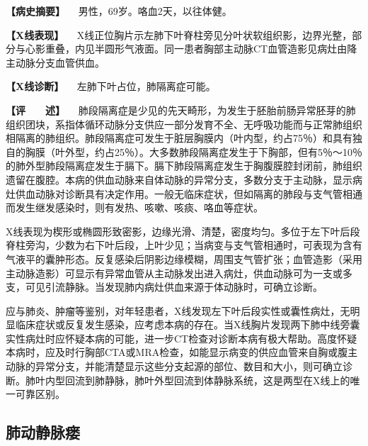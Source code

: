 \textbf{【病史摘要】} 　男性，69岁。咯血2天，以往体健。

\textbf{【X线表现】}
　X线正位胸片示左肺下叶脊柱旁见分叶状软组织影，边界光整，部分与心影重叠，内见半圆形气液面。同一患者胸部主动脉CT血管造影见病灶由降主动脉分支血管供血。

\textbf{【X线诊断】} 　左肺下叶占位，肺隔离症可能。

\textbf{【评　　述】}
　肺段隔离症是少见的先天畸形，为发生于胚胎前肠异常胚芽的肺组织团块，系指体循环动脉分支供应一部分发育不全、无呼吸功能而与正常肺组织相隔离的肺组织。肺段隔离症可发生于脏层胸膜内（叶内型，约占75％）和具有独自的胸膜（叶外型，约占25％）。大多数肺段隔离症发生于下胸部，但有5％～10％的肺外型肺段隔离症发生于膈下。膈下肺段隔离症发生于胸腹膜腔封闭前，肺组织遗留在腹腔。本病的供血动脉来自体动脉的异常分支，多数分支于主动脉，显示病灶供血动脉对诊断具有决定作用。一般无临床症状，但如隔离的肺段与支气管相通而发生继发感染时，则有发热、咳嗽、咳痰、咯血等症状。

X线表现为楔形或椭圆形致密影，边缘光滑、清楚，密度均匀。多位于左下叶后段脊柱旁沟，少数为右下叶后段，上叶少见；当病变与支气管相通时，可表现为含有气液平的囊肿形态。反复感染后阴影边缘模糊，周围支气管扩张；血管造影（采用主动脉造影）可显示有异常血管从主动脉发出进入病灶，供血动脉可为一支或多支，可见引流静脉。当发现肺内病灶供血来源于体动脉时，可确立诊断。

应与肺炎、肿瘤等鉴别，对年轻患者，X线发现左下叶后段实性或囊性病灶，无明显临床症状或反复发生感染，应考虑本病的存在。当X线胸片发现两下肺中线旁囊实性病灶时应怀疑本病的可能，进一步CT检查对诊断本病有极大帮助。高度怀疑本病时，应及时行胸部CTA或MRA检查，如能显示病变的供应血管来自胸或腹主动脉的异常分支，并能清楚显示这些分支起源的部位、数目和大小，则可确立诊断。肺叶内型回流到肺静脉，肺叶外型回流到体静脉系统，这是两型在X线上的唯一可靠区别。

\subsection{肺动静脉瘘}

